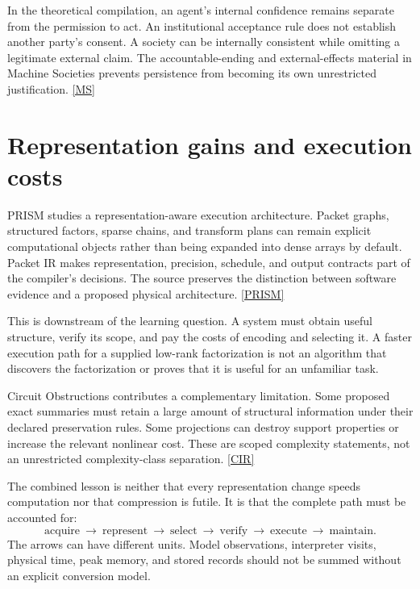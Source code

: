 \documentclass[11pt,oneside]{article}
\newcommand{\src}[1]{\hyperlink{cat:#1}{\textsf{[#1]}}}
\begin{document}
In the theoretical compilation, an agent's internal confidence remains separate from the permission to act. An institutional acceptance rule does not establish another party's consent. A society can be internally consistent while omitting a legitimate external claim. The accountable-ending and external-effects material in Machine Societies prevents persistence from becoming its own unrestricted justification. \src{MS}

\section{Representation gains and execution costs}
PRISM studies a representation-aware execution architecture. Packet graphs, structured factors, sparse chains, and transform plans can remain explicit computational objects rather than being expanded into dense arrays by default. Packet IR makes representation, precision, schedule, and output contracts part of the compiler's decisions. The source preserves the distinction between software evidence and a proposed physical architecture. \src{PRISM}

This is downstream of the learning question. A system must obtain useful structure, verify its scope, and pay the costs of encoding and selecting it. A faster execution path for a supplied low-rank factorization is not an algorithm that discovers the factorization or proves that it is useful for an unfamiliar task.

Circuit Obstructions contributes a complementary limitation. Some proposed exact summaries must retain a large amount of structural information under their declared preservation rules. Some projections can destroy support properties or increase the relevant nonlinear cost. These are scoped complexity statements, not an unrestricted complexity-class separation. \src{CIR}

The combined lesson is neither that every representation change speeds computation nor that compression is futile. It is that the complete path must be accounted for:
\[
\text{acquire}\ \longrightarrow\ \text{represent}\ \longrightarrow\ \text{select}\ \longrightarrow\ \text{verify}\ \longrightarrow\ \text{execute}\ \longrightarrow\ \text{maintain}.
\]
The arrows can have different units. Model observations, interpreter visits, physical time, peak memory, and stored records should not be summed without an explicit conversion model.
\end{document}

